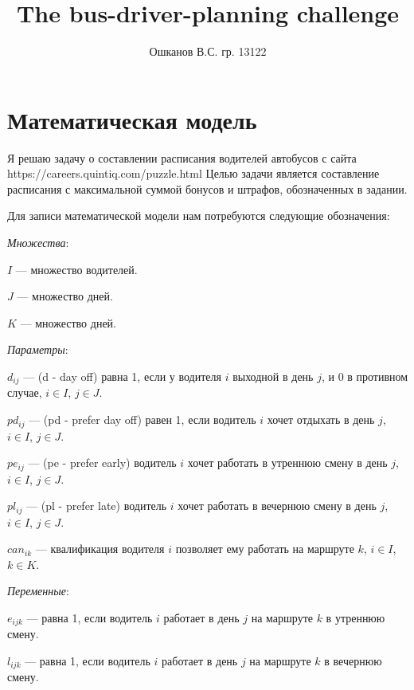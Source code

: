 \documentclass[]{article}
\title{The bus-driver-planning challenge}
\author{Ошканов В.С. гр. 13122}
\begin{document}
\maketitle
\section{Математическая модель}

Я решаю задачу о составлении расписания водителей автобусов с
сайта https://careers.quintiq.com/puzzle.html
Целью задачи является составление расписания с максимальной
суммой бонусов и штрафов, обозначенных в задании.

Для записи математической модели нам потребуются следующие обозначения:
\par
\textit{Множества}:
\par\noindent
$I$ --- множество водителей.
\par\noindent
$J$ --- множество дней.
\par\noindent
$K$ --- множество дней.
\par
\textit{Параметры}:
\par\noindent
$d_{ij}$ --- (d - day off) равна 1, если у водителя $i$ выходной в день $j$, и 0
в противном случае, $i\in I$, $j\in J$.
\par\noindent
$pd_{ij}$ --- (pd - prefer day off) равен 1, если водитель $i$ хочет отдыхать в
день $j$, $i\in I$, $j\in J$.
\par\noindent
$pe_{ij}$ --- (pe - prefer early) водитель $i$ хочет работать в утреннюю
смену в день $j$, $i\in I$, $j\in J$.
\par\noindent
$pl_{ij}$ --- (pl - prefer late) водитель $i$ хочет работать в вечернюю
смену в день $j$, $i\in I$, $j\in J$.
\par\noindent
$can_{ik}$ --- квалификация водителя $i$ позволяет ему работать на маршруте $k$,
 $i\in I$, $k\in K$.
\par
\textit{Переменные}:
\par\noindent
$e_{ijk}$ --- равна 1, если водитель $i$ работает в день $j$ на маршруте $k$
в утреннюю смену.
\par\noindent
$l_{ijk}$ --- равна 1, если водитель $i$ работает в день $j$ на маршруте $k$
в вечернюю смену.
\end{document}
